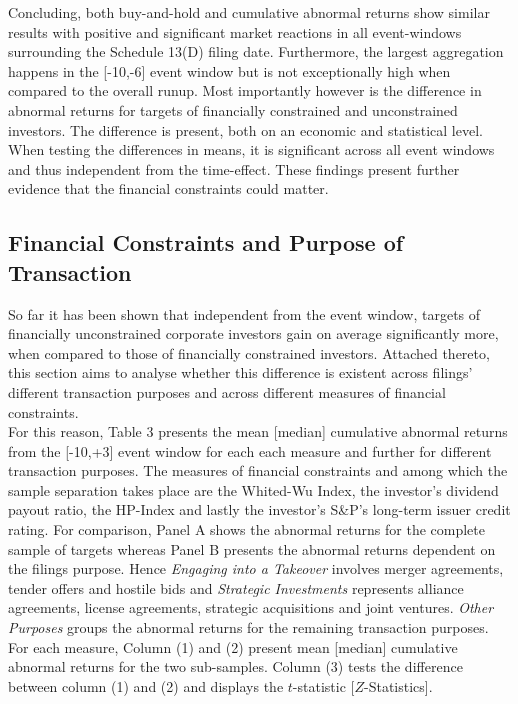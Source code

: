 \documentclass[12pt]{article}
\begin{document}
Concluding, both buy-and-hold and cumulative abnormal returns show similar results with positive and significant market reactions in all event-windows surrounding the Schedule 13(D) filing date. Furthermore, the largest aggregation happens in the [-10,-6] event window but is not exceptionally high when compared to the overall runup. Most importantly however is the difference in abnormal returns for targets of financially constrained and unconstrained investors. The difference is present, both on an economic and statistical level. When testing the differences in means, it is significant across all event windows and thus independent from the time-effect. These findings present further evidence that the financial constraints could matter. 

\subsection{Financial Constraints and Purpose of Transaction}
So far it has been shown that independent from the event window, targets of financially unconstrained corporate investors gain on average significantly more, when compared to those of financially constrained investors. Attached thereto, this section aims to analyse whether this difference is existent across filings' different transaction purposes and across different measures of financial constraints.\\
For this reason, Table 3 presents the mean [median] cumulative abnormal returns from the [-10,+3] event window for each each measure and further for different transaction purposes. The measures of financial constraints and among which the sample separation takes place are the Whited-Wu Index, the investor's dividend payout ratio, the HP-Index and lastly the investor's S\&P's long-term issuer credit rating. For comparison, Panel A shows the abnormal returns for the complete sample of targets whereas Panel B presents the abnormal returns dependent on the filings purpose. Hence \emph{Engaging into a Takeover} involves merger agreements, tender offers and hostile bids and \emph{Strategic Investments} represents alliance agreements, license agreements, strategic acquisitions and joint ventures. \emph{Other Purposes} groups the abnormal returns for the remaining transaction purposes. For each measure, Column (1) and (2) present mean [median] cumulative abnormal returns for the two sub-samples. Column (3) tests the difference between column (1) and (2) and displays the  $t$-statistic [$Z$-Statistics].
\end{document}
